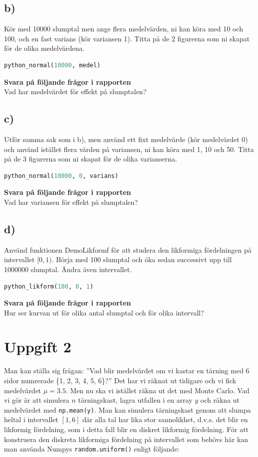 \documentclass[a4paper]{article}
\begin{document}
\subsection{b)}
Kör med 10000 slumptal men ange flera medelvärden, ni kan köra med 10 och 100,
och en fast varians (kör variansen 1). Titta på de 2 figurerna som ni skapat 
för de olika medelvärdena. 

\begin{lstlisting}[language=Python]
    python_normal(10000, medel)
\end{lstlisting}

\textbf{Svara på följande frågor i rapporten}\\
Vad har medelvärdet för effekt på slumptalen?

\subsection{c)}
Utför samma sak som i b), men använd ett fixt medelvärde (kör medelvärdet 0)
och använd istället flera värden på variansen, ni kan köra med 1, 10 och 50.
Titta på de 3 figurerna som ni skapat för de olika varianserna. 

\begin{lstlisting}[language=Python]
    python_normal(10000, 0, varians)
\end{lstlisting}

\textbf{Svara på följande frågor i rapporten}\\
Vad har variansen för effekt på slumptalen?

\subsection{d)}
Använd funktionen DemoLikformf för att studera den likformiga fördelningen på intervallet \([0,1)\).
Börja med 100 slumptal och öka sedan successivt upp till 1000000 slumptal. Ändra även intervallet.

\begin{lstlisting}[language=Python]
    python_likform(100, 0, 1)
\end{lstlisting}

\textbf{Svara på följande frågor i rapporten}\\
Hur ser kurvan ut för olika antal slumptal och för olika intervall?

\newpage
\section{Uppgift 2}
Man kan ställa sig frågan: ”Vad blir medelvärdet om vi kastar en tärning med 6 sidor numrerade \{1, 2, 3, 4, 5, 6\}?”
Det har vi räknat ut tidigare och vi fick medelvärdet \( \mu=3.5 \). 
Men nu ska vi istället räkna ut det med Monte Carlo.
Vad vi gör är att simulera \( n \)  tärningskast, lagra utfallen i en array \( y \)
och räkna ut medelvärdet med \lstinline{np.mean(y)}. Man kan simulera tärningskast genom att 
slumpa heltal i intervallet \( [1,6] \) där alla tal har lika stor sannolikhet, 
d.v.s. det blir en likformig fördelning, som i detta fall blir en diskret likformig fördelning.
För att konstruera den diskreta likformiga fördelning på intervallet som behövs här kan man använda
Numpys \lstinline{random.uniform()} enligt följande:
\end{document}
